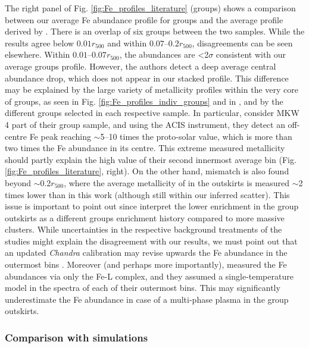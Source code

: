 \documentclass{aa}
\begin{document}
The right panel of Fig. \ref{fig:Fe_profiles_literature} (groups) shows a comparison between our average Fe abundance profile for groups and the average profile derived by \citet{2007MNRAS.380.1554R}. There is an overlap of six groups between the two samples. While the results agree below $0.01 r_{500}$ and within $0.07$--$0.2r_{500}$, disagreements can be seen elsewhere. Within $0.01$--$0.07r_{500}$, the \citet{2007MNRAS.380.1554R} abundances are <2$\sigma$ consistent with our average groups profile. However, the authors detect a deep average central abundance drop, which does not appear in our stacked profile. This difference may be explained by the large variety of metallicity profiles within the very core of groups, as seen in Fig. \ref{fig:Fe_profiles_indiv_groups} and in \citet[][see their fig. 3]{2007MNRAS.380.1554R}, and by the different groups selected in each respective sample. In particular, \citet{2007MNRAS.380.1554R} consider MKW\,4 part of their group sample, and using the ACIS instrument, they detect an off-centre Fe peak reaching $\sim$5--10 times the proto-solar value, which is more than two times the Fe abundance in its centre. This extreme measured metallicity should partly explain the high value of their second innermost average bin (Fig. \ref{fig:Fe_profiles_literature}, right).
On the other hand, mismatch is also found beyond $\sim$0.2$r_{500}$, where the average metallicity of \citet{2007MNRAS.380.1554R} in the outskirts is measured $\sim$2 times lower than in this work (although still within our inferred scatter). This issue is important to point out since \citet{2007MNRAS.380.1554R} interpret the lower enrichment in the group outskirts as a different groups enrichment history compared to more massive clusters. While uncertainties in the respective background treatments of the studies might explain the disagreement with our results, we must point out that an updated \textit{Chandra} calibration may revise upwards the Fe abundance in the outermost bins \citep[e.g. $\sim$+25\% for NGC\,4325][]{2009MNRAS.399..239R}. Moreover (and perhaps more importantly), \citet{2007MNRAS.380.1554R} measured the Fe abundances via only the Fe-L complex, and they assumed a single-temperature model in the spectra of each of their outermost bins. This may significantly underestimate the Fe abundance in case of a multi-phase plasma in the group outskirts.






\subsubsection{Comparison with simulations}\label{sect:Fe_simulations}
\end{document}
